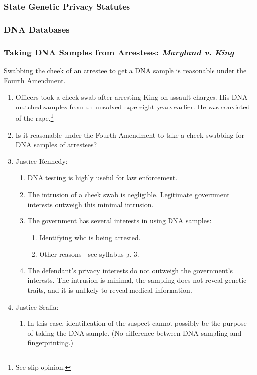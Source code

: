 \subsubsection{State Genetic Privacy Statutes}


\subsubsection{DNA Databases}


\subsubsection{Taking DNA Samples from Arrestees: \emph{Maryland v. King}}

Swabbing the cheek of an arrestee to get a DNA sample is reasonable under the 
Fourth Amendment.

\begin{enumerate}
    \item Officers took a cheek swab after arresting King on assault charges. 
    His DNA matched samples from an unsolved rape eight years earlier. He was 
    convicted of the rape.\footnote{See slip opinion.}
    \item Is it reasonable under the Fourth Amendment to take a cheek swabbing 
    for DNA samples of arrestees?
    \item Justice Kennedy:
    \begin{enumerate}
        \item DNA testing is highly useful for law enforcement.
        \item The intrusion of a cheek swab is negligible. Legitimate government 
        interests outweigh this minimal intrusion.
        \item The government has several interests in using DNA samples:
        \begin{enumerate}
            \item Identifying who is being arrested.
            \item Other reasons---see syllabus p. 3.
        \end{enumerate}
        \item The defendant's privacy interests do not outweigh the government's 
        interests. The intrusion is minimal, the sampling does not reveal 
        genetic traits, and it is unlikely to reveal medical information.
    \end{enumerate}
    \item Justice Scalia:
    \begin{enumerate}
        \item In this case, identification of the suspect cannot possibly be the 
        purpose of taking the DNA sample. (No difference between DNA sampling 
        and fingerprinting.)
    \end{enumerate}
\end{enumerate}
